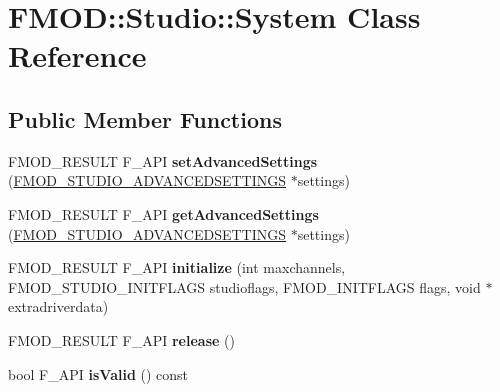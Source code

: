 \hypertarget{class_f_m_o_d_1_1_studio_1_1_system}{\section{F\+M\+O\+D\+:\+:Studio\+:\+:System Class Reference}
\label{class_f_m_o_d_1_1_studio_1_1_system}
}
\subsection*{Public Member Functions}
\begin{DoxyCompactItemize}
\item 
\hypertarget{class_f_m_o_d_1_1_studio_1_1_system_a4733497275af484219f80e6a55eb3796}{F\+M\+O\+D\+\_\+\+R\+E\+S\+U\+L\+T F\+\_\+\+A\+P\+I {\bfseries set\+Advanced\+Settings} (\hyperlink{struct_f_m_o_d___s_t_u_d_i_o___a_d_v_a_n_c_e_d_s_e_t_t_i_n_g_s}{F\+M\+O\+D\+\_\+\+S\+T\+U\+D\+I\+O\+\_\+\+A\+D\+V\+A\+N\+C\+E\+D\+S\+E\+T\+T\+I\+N\+G\+S} $\ast$settings)}\label{class_f_m_o_d_1_1_studio_1_1_system_a4733497275af484219f80e6a55eb3796}

\item 
\hypertarget{class_f_m_o_d_1_1_studio_1_1_system_ac0c07b7e6916d1256a5fa9ae474c8f81}{F\+M\+O\+D\+\_\+\+R\+E\+S\+U\+L\+T F\+\_\+\+A\+P\+I {\bfseries get\+Advanced\+Settings} (\hyperlink{struct_f_m_o_d___s_t_u_d_i_o___a_d_v_a_n_c_e_d_s_e_t_t_i_n_g_s}{F\+M\+O\+D\+\_\+\+S\+T\+U\+D\+I\+O\+\_\+\+A\+D\+V\+A\+N\+C\+E\+D\+S\+E\+T\+T\+I\+N\+G\+S} $\ast$settings)}\label{class_f_m_o_d_1_1_studio_1_1_system_ac0c07b7e6916d1256a5fa9ae474c8f81}

\item 
\hypertarget{class_f_m_o_d_1_1_studio_1_1_system_ad5f95bcdb0f0d762a839c9ad1a964f1c}{F\+M\+O\+D\+\_\+\+R\+E\+S\+U\+L\+T F\+\_\+\+A\+P\+I {\bfseries initialize} (int maxchannels, F\+M\+O\+D\+\_\+\+S\+T\+U\+D\+I\+O\+\_\+\+I\+N\+I\+T\+F\+L\+A\+G\+S studioflags, F\+M\+O\+D\+\_\+\+I\+N\+I\+T\+F\+L\+A\+G\+S flags, void $\ast$extradriverdata)}\label{class_f_m_o_d_1_1_studio_1_1_system_ad5f95bcdb0f0d762a839c9ad1a964f1c}

\item 
\hypertarget{class_f_m_o_d_1_1_studio_1_1_system_aa91352b2ef19bf2eb44caa98c4c5e610}{F\+M\+O\+D\+\_\+\+R\+E\+S\+U\+L\+T F\+\_\+\+A\+P\+I {\bfseries release} ()}\label{class_f_m_o_d_1_1_studio_1_1_system_aa91352b2ef19bf2eb44caa98c4c5e610}

\item 
\hypertarget{class_f_m_o_d_1_1_studio_1_1_system_acce7351e16933dd2782e4b93e1570d6a}{bool F\+\_\+\+A\+P\+I {\bfseries is\+Valid} () const }\label{class_f_m_o_d_1_1_studio_1_1_system_acce7351e16933dd2782e4b93e1570d6a}


\end{DoxyCompactItemize}
